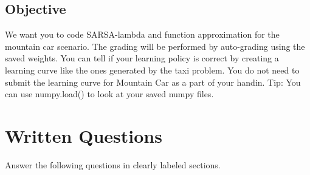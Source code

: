 \documentclass[12pt]{article}
\begin{document}
\subsection{Objective}
We want you to code SARSA-lambda and function approximation for the mountain car scenario. The grading will be performed by auto-grading using the saved weights. You can tell if your learning policy is correct by creating a learning curve like the ones generated by the taxi problem. You do not need to submit the learning curve for Mountain Car as a part of your handin.
\newline
Tip: You can use numpy.load() to look at your saved numpy files.

\section{Written Questions}
Answer the following questions in clearly labeled sections.
\end{document}
